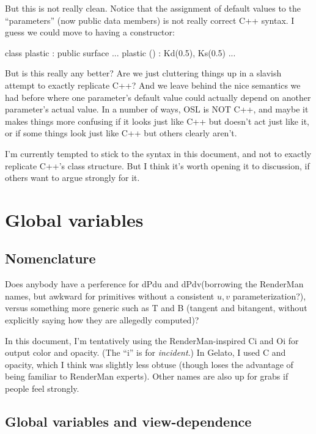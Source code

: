 \documentclass[11pt,letterpaper]{book}
\def\dPdu{{\cf dPdu}\xspace}
\def\dPdv{{\cf dPdv}\xspace}
\begin{document}
\begin{annotate}
But this is not really clean.  Notice that the assignment of default
values to the ``parameters'' (now public data members) is not really
correct C++ syntax.  I guess we could move to having a constructor:

\begin{code}
    class plastic : public surface
    {
        ...
        plastic () : Kd(0.5), Ks(0.5)
        {
        }
        ...
    }
\end{code}

But is this really any better?  Are we just cluttering things up in a
slavish attempt to exactly replicate C++?  And we leave behind the nice
semantics we had before where one parameter's default value could
actually depend on another parameter's actual value.  In a number of
ways, OSL is NOT C++, and maybe it makes things more confusing if it
looks just like C++ but doesn't act just like it, or if some things look
just like C++ but others clearly aren't.

I'm currently tempted to stick to the syntax in this document, and not
to exactly replicate C++'s class structure.  But I think it's worth
opening it to discussion, if others want to argue strongly for it.


\section{Global variables}

\subsection{Nomenclature}

Does anybody have a perference for \dPdu and \dPdv (borrowing the
RenderMan names, but awkward for primitives without a consistent $u,v$
parameterization?), versus something more generic such as {\cf T} and
{\cf B} (tangent and bitangent, without explicitly saying how they are
allegedly computed)?

In this document, I'm tentatively using the RenderMan-inspired {\cf Ci}
and {\cf Oi} for output color and opacity.  (The ``i'' is for
\emph{incident}.)  In Gelato, I used {\cf C} and {\cf opacity}, which I
think was slightly less obtuse (though loses the advantage of being
familiar to RenderMan experts).  Other names are also up for grabs if
people feel strongly.


\subsection{Global variables and view-dependence}


\end{annotate}
\end{document}
